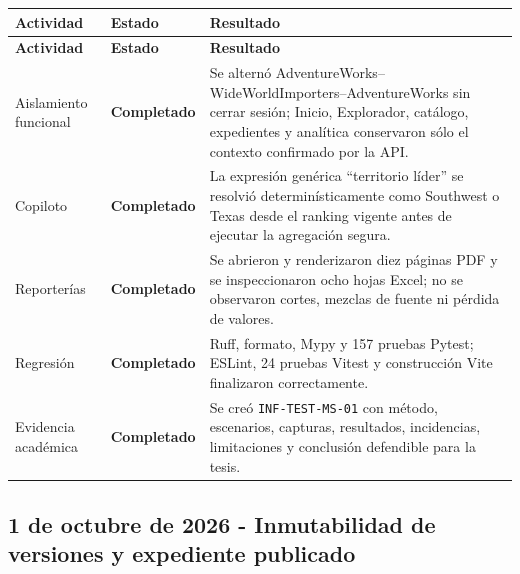 \documentclass[11pt,letterpaper]{article}
\newcommand{\statusok}{\textcolor{deepgreen}{\textbf{Completado}}}
\newcommand{\file}[1]{\texttt{#1}}
\begin{document}
\begin{longtable}{@{}p{}p{}p{}@{}}
  \toprule
  \textbf{Actividad} & \textbf{Estado} & \textbf{Resultado} \\
  \midrule
  \endfirsthead
  \toprule
  \textbf{Actividad} & \textbf{Estado} & \textbf{Resultado} \\
  \midrule
  \endhead
  Aislamiento funcional & \statusok & Se alternó AdventureWorks--WideWorldImporters--AdventureWorks sin cerrar sesión; Inicio, Explorador, catálogo, expedientes y analítica conservaron sólo el contexto confirmado por la API. \\
  Copiloto & \statusok & La expresión genérica ``territorio líder'' se resolvió determinísticamente como Southwest o Texas desde el ranking vigente antes de ejecutar la agregación segura. \\
  Reporterías & \statusok & Se abrieron y renderizaron diez páginas PDF y se inspeccionaron ocho hojas Excel; no se observaron cortes, mezclas de fuente ni pérdida de valores. \\
  Regresión & \statusok & Ruff, formato, Mypy y 157 pruebas Pytest; ESLint, 24 pruebas Vitest y construcción Vite finalizaron correctamente. \\
  Evidencia académica & \statusok & Se creó \file{INF-TEST-MS-01} con método, escenarios, capturas, resultados, incidencias, limitaciones y conclusión defendible para la tesis. \\
  \bottomrule
\end{longtable}

\subsection{1 de octubre de 2026 - Inmutabilidad de versiones y expediente publicado}
\end{document}
